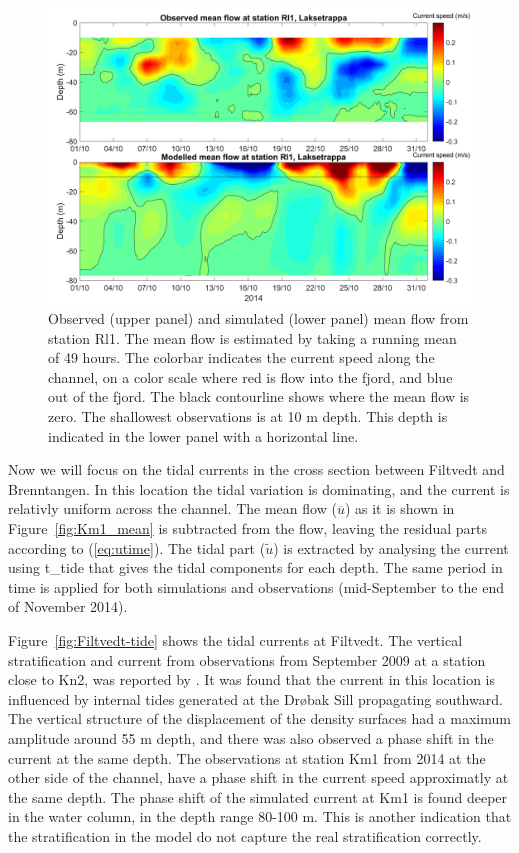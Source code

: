 \clearpage 

\begin{figure}[ht]
	\centerline{
		\includegraphics*[trim=0 0 0 0,clip=true,width=\textwidth]{Figurer/AndreS/Rl1_Obs_vs_Mod_mean_v2}}
	\caption{\small Observed (upper panel) and simulated (lower panel) mean flow from station Rl1. The mean flow is estimated by taking a running mean of 49 hours. The colorbar indicates the current speed along the channel, on a color scale where red is flow into the fjord, and blue out of the fjord. The black contourline shows where the mean flow is zero. The shallowest observations is at 10 m depth. This depth is indicated in the lower panel with a horizontal line.}
	\label{fig:Rl1_mean}
\end{figure}

\clearpage 

Now we will focus on the tidal currents in the cross section between Filtvedt and Brenntangen. In this location the tidal variation is dominating, and the current is relativly uniform across the channel. The mean flow ($\overline{u}$) as it is shown in Figure~\ref{fig:Km1_mean} is subtracted from the flow, leaving the residual parts according to (\ref{eq:utime}). The tidal part ($\widetilde{u}$) is extracted by analysing the current using t\_tide \cite[]{pavlo:etal:2002} that gives the tidal components for each depth. The same period in time is applied for both simulations and observations (mid-September to the end of November 2014). 

Figure~\ref{fig:Filtvedt-tide} shows the tidal currents at Filtvedt. The vertical stratification and current from observations from September 2009 at a station close to Kn2, was reported by \cite{staal:etal:2012}. It was found that the current in this location is influenced by internal tides generated at the Dr{\o}bak Sill propagating southward. The vertical structure of the displacement of the density surfaces had a maximum amplitude around 55 m depth, and there was also observed a phase shift in the current at the same depth. The observations at station Km1 from 2014 at the other side of the channel, have a phase shift in the current speed approximatly at the same depth. The phase shift of the simulated current at Km1 is found deeper in the water column, in the depth range 80-100 m. This is another indication that the stratification in the model do not capture the real stratification correctly.

